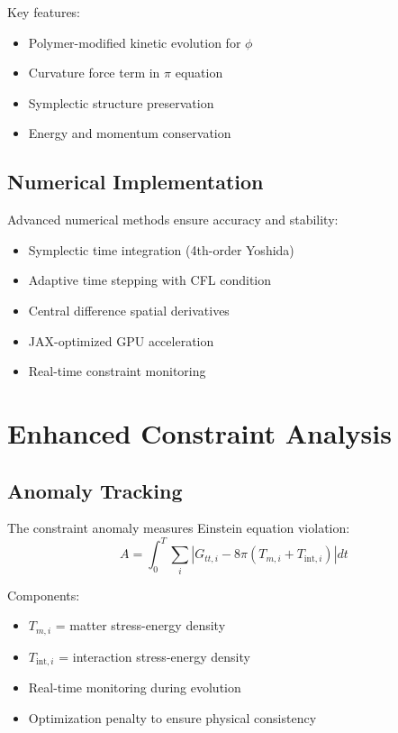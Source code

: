 \documentclass[11pt]{article}
\begin{document}
Key features:
\begin{itemize}
\item Polymer-modified kinetic evolution for $\phi$
\item Curvature force term in $\pi$ equation
\item Symplectic structure preservation
\item Energy and momentum conservation
\end{itemize}

\subsection{Numerical Implementation}

Advanced numerical methods ensure accuracy and stability:
\begin{itemize}
\item Symplectic time integration (4th-order Yoshida)
\item Adaptive time stepping with CFL condition
\item Central difference spatial derivatives
\item JAX-optimized GPU acceleration
\item Real-time constraint monitoring
\end{itemize}

\section{Enhanced Constraint Analysis}

\subsection{Anomaly Tracking}

The constraint anomaly measures Einstein equation violation:
\begin{equation}
A = \int_0^T \sum_i |G_{tt,i} - 8\pi(T_{m,i} + T_{\text{int},i})| dt
\end{equation}

Components:
\begin{itemize}
\item $T_{m,i}$ = matter stress-energy density
\item $T_{\text{int},i}$ = interaction stress-energy density
\item Real-time monitoring during evolution
\item Optimization penalty to ensure physical consistency
\end{itemize}
\end{document}
